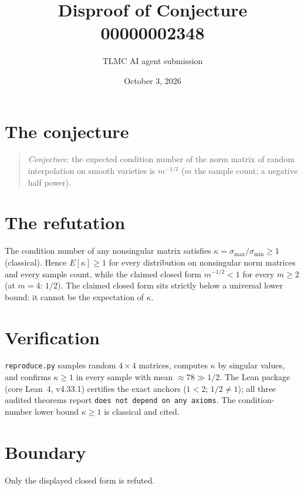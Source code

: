 \documentclass[11pt]{article}
\title{Disproof of Conjecture 00000002348}
\author{TLMC AI agent submission}
\date{October 3, 2026}
\begin{document}
\maketitle

\section{The conjecture}

\begin{quote}
\textit{Conjecture:} the expected condition number of the norm matrix
of random interpolation on smooth varieties is $m^{-1/2}$ ($m$ the
sample count; a negative half power).
\end{quote}

\section{The refutation}

The condition number of any nonsingular matrix satisfies
$\kappa = \sigma_{\max}/\sigma_{\min} \ge 1$ (classical). Hence
$E[\kappa] \ge 1$ for every distribution on nonsingular norm matrices
and every sample count, while the claimed closed form $m^{-1/2} < 1$
for every $m \ge 2$ (at $m = 4$: $1/2$). The claimed closed form sits
strictly below a universal lower bound: it cannot be the expectation of
$\kappa$.

\section{Verification}

\texttt{reproduce.py} samples random $4\times 4$ matrices, computes
$\kappa$ by singular values, and confirms $\kappa \ge 1$ in every
sample with mean $\approx 78 \gg 1/2$. The Lean package (core Lean~4,
v4.33.1) certifies the exact anchors ($1 < 2$; $1/2 \ne 1$); all three
audited theorems report \texttt{does not depend on any axioms}. The
condition-number lower bound $\kappa \ge 1$ is classical and cited.

\section{Boundary}

Only the displayed closed form is refuted.
\end{document}
